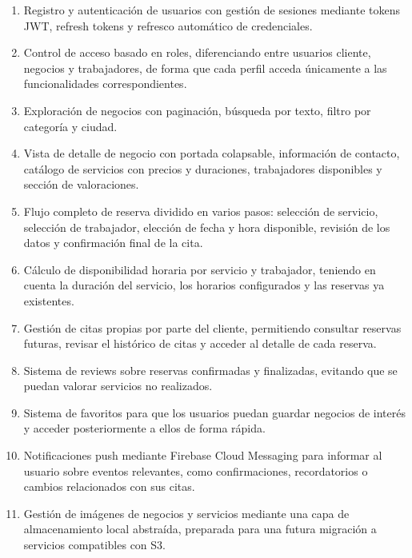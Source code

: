 \documentclass[12pt,a4paper,twoside]{report}
\begin{document}
\begin{enumerate}
  \item Registro y autenticación de usuarios con gestión de sesiones mediante tokens JWT, refresh tokens y refresco automático de credenciales.

  \item Control de acceso basado en roles, diferenciando entre usuarios cliente, negocios y trabajadores, de forma que cada perfil acceda únicamente a las funcionalidades correspondientes.

  \item Exploración de negocios con paginación, búsqueda por texto, filtro por categoría y ciudad.

  \item Vista de detalle de negocio con portada colapsable, información de contacto, catálogo de servicios con precios y duraciones, trabajadores disponibles y sección de valoraciones.

  \item Flujo completo de reserva dividido en varios pasos: selección de servicio, selección de trabajador, elección de fecha y hora disponible, revisión de los datos y confirmación final de la cita.

  \item Cálculo de disponibilidad horaria por servicio y trabajador, teniendo en cuenta la duración del servicio, los horarios configurados y las reservas ya existentes.

  \item Gestión de citas propias por parte del cliente, permitiendo consultar reservas futuras, revisar el histórico de citas y acceder al detalle de cada reserva.

  \item Sistema de reviews sobre reservas confirmadas y finalizadas, evitando que se puedan valorar servicios no realizados.

  \item Sistema de favoritos para que los usuarios puedan guardar negocios de interés y acceder posteriormente a ellos de forma rápida.

  \item Notificaciones push mediante Firebase Cloud Messaging para informar al usuario sobre eventos relevantes, como confirmaciones, recordatorios o cambios relacionados con sus citas.

  \item Gestión de imágenes de negocios y servicios mediante una capa de almacenamiento local abstraída, preparada para una futura migración a servicios compatibles con S3.


\end{enumerate}
\end{document}
